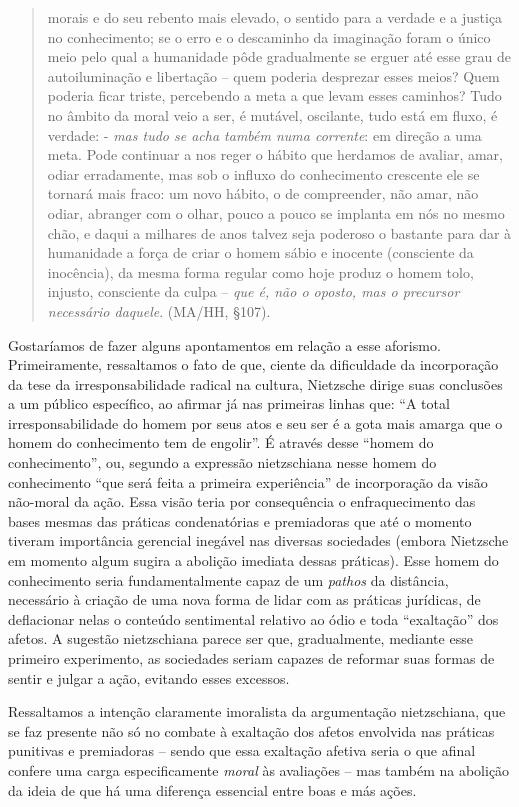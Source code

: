 \documentclass[
	12pt,				%
	openright,			%
	oneside,			%
	a4paper,			%
	english,			%
	french,				%
	spanish,			%
	brazil				%
	]{abntex2}
\begin{document}
\begin{quotation}
morais e do seu rebento mais elevado, o sentido para a verdade e a justiça no conhecimento; se o erro e o descaminho da imaginação foram o único meio pelo qual a humanidade pôde gradualmente se erguer até esse grau de autoiluminação e libertação – quem poderia desprezar esses meios? Quem poderia ficar triste, percebendo a meta a que levam esses caminhos? Tudo no âmbito da moral veio a ser, é mutável, oscilante, tudo está em fluxo, é verdade: - \textit{mas tudo se acha também numa corrente}: em direção a uma meta. Pode continuar a nos reger o hábito que herdamos de avaliar, amar, odiar erradamente, mas sob o influxo do conhecimento crescente ele se tornará mais fraco: um novo hábito, o de compreender, não amar, não odiar, abranger com o olhar, pouco a pouco se implanta em nós no mesmo chão, e daqui a milhares de anos talvez seja poderoso o bastante para dar à humanidade a força de criar o homem sábio e inocente (consciente da inocência), da mesma forma regular como hoje produz o homem tolo, injusto, consciente da culpa – \textit{que é, não o oposto, mas o precursor necessário daquele}. (MA/HH, §107).
\end{quotation}

Gostaríamos de fazer alguns apontamentos em relação a esse aforismo. Primeiramente, ressaltamos o fato de que, ciente da dificuldade da incorporação da tese da irresponsabilidade radical na cultura, Nietzsche dirige suas conclusões a um público específico, ao afirmar já nas primeiras linhas que: “A total irresponsabilidade do homem por seus atos e seu ser é a gota mais amarga que o homem do conhecimento tem de engolir”. É através desse “homem do conhecimento”, ou, segundo a expressão nietzschiana nesse homem do conhecimento “que será feita a primeira experiência” de incorporação da visão não-moral da ação. Essa visão teria por consequência o enfraquecimento das bases mesmas das práticas condenatórias e premiadoras que até o momento tiveram importância gerencial inegável nas diversas sociedades (embora Nietzsche em momento algum sugira a abolição imediata dessas práticas). Esse homem do conhecimento seria fundamentalmente capaz de um \textit{pathos} da distância, necessário à criação de uma nova forma de lidar com as práticas jurídicas, de deflacionar nelas o conteúdo sentimental relativo ao ódio e toda “exaltação” dos afetos. A sugestão nietzschiana parece ser que, gradualmente, mediante esse primeiro experimento, as sociedades seriam capazes de reformar suas formas de sentir e julgar a ação, evitando esses excessos.

	Ressaltamos a intenção claramente imoralista da argumentação nietzschiana, que se faz presente não só no combate à exaltação dos afetos envolvida nas práticas punitivas e premiadoras – sendo que essa exaltação afetiva seria o que afinal confere uma carga especificamente \textit{moral} às avaliações – mas também na abolição da ideia de que há uma diferença essencial entre boas e más ações. 
	
\end{document}

